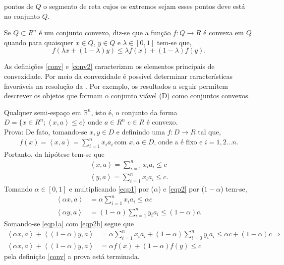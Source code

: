  pontos de $Q$ o segmento de reta cujos os extremos sejam esses pontos deve est\'a no conjunto $Q$.
 	\begin{defin}%
		\label{conv2}
   		Se $Q \subset R^n$ \'e um conjunto convexo, diz-se que a fun\c c\~ao $f:Q \rightarrow R$ \'e convexa em $Q$ quando para quaisquer 
    	$x \in Q$, $y \in Q$ e $\lambda \in [0,1]$ tem-se que,
   			\begin{equation*}
	    		f(\lambda x + (1-\lambda)y) \leq \lambda f(x) + (1-\lambda)f(y).
   			\end{equation*}
	\end{defin}
 \noindent
 As defini\c c\~oes \autoref{conv} e \autoref{conv2} caracterizam os elementos principais de convexidade. Por meio da
 convexidade \'e poss\'ivel determinar caracter\'isticas favor\'aveis na resolu\c c\~ao da . Por exemplo, os
 resultados a seguir permitem descrever os objetos que formam o conjunto vi\'avel (D) como conjuntos convexos.
 	\begin{prop}%
	 	\label{propv1}
	 	Qualquer semi-espa\c co em $\mathbb{R}^n$, isto \'e, o conjunto da forma $D = \{x \in R^n;\left <x,a \right >  \leq
	 	c\}$ onde $a \in R^n$ $c \in R$ \'e convexo.\\
	 	Prova: 
	 	De fato, tomando-se $x,y \in D$ e definindo uma $f: D\rightarrow R$ tal que,
	 		\begin{align*}
		 		f(x) =\left <x,a \right >  = \sum_{i = 1}^{n}x_ia_i \hspace{2pt} \mbox{com $x,a \in D$, onde a \'e fixo e $i = 1,2 \dots n$}.
	 		\end{align*}
	 	Portanto, da hip\'otese tem-se que \\
	 		\begin{align}
		 		\left <x,a\right > = \sum_{i = 1}^{n} x_ia_i \leq c \label{eqp1}\\
		 		\left <y,a\right > = \sum_{i = 1}^{n} x_ia_i \leq c  \label{eqp2}.
	 		\end{align}
	 	Tomando $\alpha \in [0,1]$ e multiplicando \ref{eqp1} por ($\alpha$) e \ref{eqp2} por ($1 - \alpha$) tem-se,
	 		\begin{align}
		 		\left <\alpha x,a\right > &= \alpha \sum_{i = 1}^{n} x_ia_i \leq \alpha c \label{eqp1a}\\
		 		\left <\alpha y,a\right > &= (1-\alpha)\sum_{i = 1}^{n} y_ia_i \leq (1 - \alpha)c  \label{eqp2b}.
	 		\end{align}
	 	Somando-se \ref{eqp1a} com \ref{eqp2b} segue que
	 		\begin{align*}
		 		\left <\alpha x,a\right > + \left <(1-\alpha) y,a\right >  &= \alpha \sum_{i = 1}^{n} x_ia_i + (1-\alpha)\sum_{i =
		 		0}^{n} y_ia_i \leq \alpha c + (1 - \alpha)c \Rightarrow \nonumber\\
		 		\left <\alpha x,a\right > + \left <(1 -\alpha) y,a\right >  &= \alpha f(x) + (1 - \alpha)f(y) \leq c
	 		\end{align*}
	 	pela defini\c c\~ao \autoref{conv} a prova est\'a terminada.
	\end{prop}
